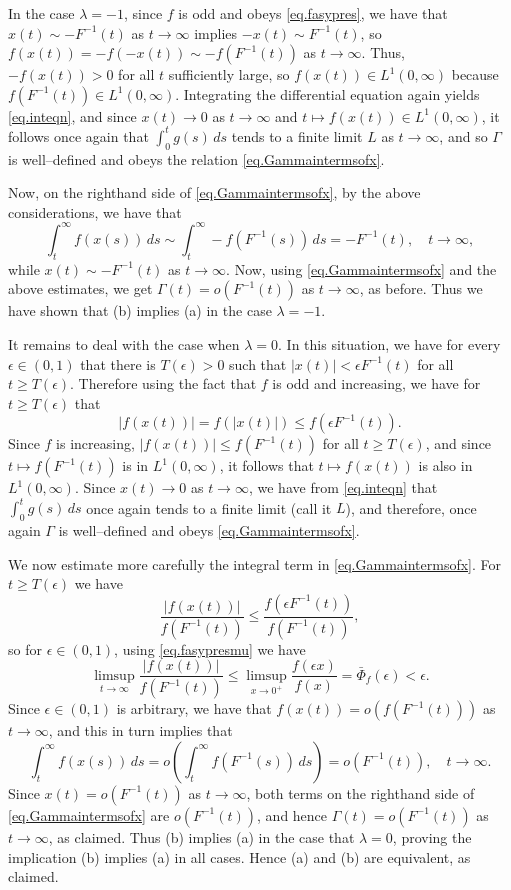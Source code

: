 \documentclass[a4paper,10pt,reqno]{amsart}
\numberwithin{equation}{section}
\theoremstyle{definition}
\theoremstyle{remark}
\DeclareMathOperator{\1}{\mathbbm 1}
\begin{document}
	In the case $\lambda=-1$, since $f$ is odd and obeys \eqref{eq.fasypres}, we have that $x(t)\sim -F^{-1}(t)$ as $t\to\infty$ implies $-x(t)\sim F^{-1}(t)$, so $f(x(t))=-f(-x(t))\sim -f(F^{-1}(t))$ as $t\to\infty$. Thus, $-f(x(t))>0$ for all $t$ sufficiently large, so 
	$f(x(t))\in L^1(0,\infty)$ because $f(F^{-1}(t))\in L^1(0,\infty)$. Integrating the differential equation again yields \eqref{eq.inteqn}, and since $x(t)\to 0$ as $t\to\infty$ and $t\mapsto f(x(t))\in L^1(0,\infty)$, it follows once again that $\int_0^t g(s)\,ds$ tends to a finite limit $L$ as $t\to\infty$, and so $\Gamma$ is well--defined and obeys the relation \eqref{eq.Gammaintermsofx}.
	
	Now, on the righthand side of \eqref{eq.Gammaintermsofx}, by the above considerations, we have that 
	\[
	\int_t^\infty f(x(s))\,ds \sim \int_t^\infty -f(F^{-1}(s))\,ds =-F^{-1}(t), \quad t\to\infty,
	\]    
	while $x(t)\sim -F^{-1}(t)$ as $t\to\infty$. Now, using \eqref{eq.Gammaintermsofx} and the above estimates, we get $\Gamma(t)=o(F^{-1}(t))$ as $t\to\infty$, as before. Thus we have shown that (b) implies (a) in the case $\lambda=-1$.
	
	It remains to deal with the case when $\lambda=0$. In this situation, we have for every $\epsilon\in (0,1)$ that there is $T(\epsilon)>0$ such that 
	$|x(t)|<\epsilon F^{-1}(t)$ for all $t\geq T(\epsilon)$. Therefore using the fact that $f$ is odd and increasing, we have for $t\geq T(\epsilon)$ that 
	\[
	|f(x(t))|=f(|x(t)|)\leq f(\epsilon F^{-1}(t)).
	\]
	Since $f$ is increasing, $|f(x(t))|\leq f( F^{-1}(t))$ for all $t\geq T(\epsilon)$, and since $t\mapsto f(F^{-1}(t))$ is in $L^1(0,\infty)$, it follows that $t\mapsto f(x(t))$ is also in $L^1(0,\infty)$. Since $x(t)\to 0$ as $t\to\infty$, we have from \eqref{eq.inteqn} that $\int_0^t g(s)\,ds$ once again tends to a finite limit (call it $L$), and therefore, once again $\Gamma$ is well--defined and obeys \eqref{eq.Gammaintermsofx}. 
	
	We now estimate more carefully the integral term in \eqref{eq.Gammaintermsofx}. For $t\geq T(\epsilon)$ we have 
	\[
	\frac{|f(x(t))|}{f(F^{-1}(t))}\leq \frac{f(\epsilon F^{-1}(t))}{f(F^{-1}(t))},
	\]
	so for $\epsilon \in (0,1)$, using \eqref{eq.fasypresmu} we have 
	\[
	\limsup_{t\to\infty} \frac{|f(x(t))|}{f(F^{-1}(t))}\leq 
	\limsup_{x\to 0^+} \frac{f(\epsilon x)}{f(x)}=\bar{\Phi}_f(\epsilon)<\epsilon.
	\]
	Since $\epsilon\in (0,1)$ is arbitrary, we have that $f(x(t))=o(f(F^{-1}(t)))$ as $t\to\infty$, and this in turn implies that 
	\[
	\int_{t}^\infty f(x(s))\,ds = o\left(\int_t^\infty f(F^{-1}(s))\,ds\right)=o(F^{-1}(t)), \quad t\to\infty.
	\]
	Since $x(t)=o(F^{-1}(t))$ as $t\to\infty$, both terms on the righthand side of \eqref{eq.Gammaintermsofx} are $o(F^{-1}(t))$, and hence $\Gamma(t)=o(F^{-1}(t))$ as $t\to\infty$, as claimed. Thus (b) implies (a) in the case that $\lambda=0$, proving the implication (b) implies (a) in all cases. Hence (a) and (b) are equivalent, as claimed. 
	
\end{document}
